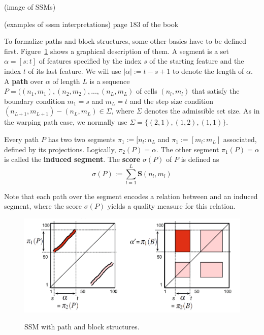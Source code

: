 \documentclass[a4paper, 9pt, twocolumn]{extarticle}
\begin{document}
(image of SSMs)

(examples of sssm interpretations) page 183 of the book

To formalize paths and block structures, some other basics have to be defined first. Figure~\ref{fig:ssmPathBlock} shows a graphical description of them. A segment is a set $\alpha=[s:t]$ of features specified by the index $s$ of the starting feature and the index $t$ of its last feature. We will use $|\alpha|:=t-s+1$ to denote the length of $\alpha$. A \textbf{path} over $\alpha$ of length $L$ is a sequence $P=((n_{1},m_{1}), (n_{2},m_{2}), ..., (n_{L},m_{L})$ of cells $(n_{l}, m_{l})$ that satisfy the boundary condition $m_{1}=s$ and $m_{L}=t$ and the step size condition $(n_{L+1},m_{L+1})-(n_{L},m_{L})\in \Sigma$, where $\Sigma$ denotes the admissible set size. As in the warping path case, we normally use $\Sigma=\{(2,1), (1,2), (1,1)\}$.

Every path $P$ has two two segments $\pi_{1}:=[n_{l}:n_{L}$ and $\pi_{1}:=[m_{l}:m_{L}]$ associated, defined by its projections. Logically, $\pi_{2}(P)= \alpha$. The other segment $\pi _{1} (P)= \alpha$ is called the \textbf{induced segment}. The \textbf{score} $\sigma (P)$ of $P$ is defined as\[\sigma(P):= 	\sum_{l=1}^{L}\textbf{S}(n_{l}, m_{l})\]

Note that each path over the segment \alpha  encodes a relation between \alpha and an induced segment, where the score $\sigma(P)$ yields a quality measure for this relation.

\begin{figure}[h]
  \includegraphics[width=\linewidth]{images/SSMpathBlocks.png}
  \label{fig:ssmPathBlock}
	\begin{center}
		\caption{SSM with path and block structures.}
	\end{center}
\end{figure}
\end{document}
